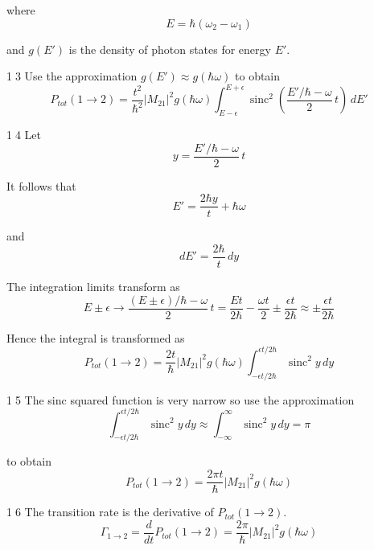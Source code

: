 \documentclass[12pt]{article}
\begin{document}
where
\begin{equation*}
E=\hbar(\omega_2-\omega_1)
\end{equation*}

and $g(E')$ is the density of photon states for energy $E'$.

\bigskip
\textcircled{\scriptsize13}
Use the approximation $g(E')\approx g(\hbar\omega)$ to obtain
\begin{equation*}
P_{tot}(1\rightarrow2)=\frac{t^2}{\hbar^2}|M_{21}|^2g(\hbar\omega)
\int_{E-\epsilon}^{E+\epsilon}
\operatorname{sinc}^2\left(\frac{E'/\hbar-\omega}{2}\,t\right)\,dE'
\end{equation*}

\textcircled{\scriptsize14}
Let
\begin{equation*}
y=\frac{E'/\hbar-\omega}{2}\,t
\end{equation*}

It follows that
\begin{equation*}
E'=\frac{2\hbar y}{t}+\hbar\omega
\end{equation*}

and
\begin{equation*}
dE'=\frac{2\hbar}{t}\,dy
\end{equation*}

The integration limits transform as
\begin{equation*}
E\pm\epsilon
\rightarrow
\frac{(E\pm\epsilon)/\hbar-\omega}{2}\,t
=\frac{Et}{2\hbar}-\frac{\omega t}{2}
\pm\frac{\epsilon t}{2\hbar}
\approx
\pm\frac{\epsilon t}{2\hbar}
\end{equation*}

Hence the integral is transformed as
\begin{equation*}
P_{tot}(1\rightarrow2)=\frac{2t}{\hbar}|M_{21}|^2g(\hbar\omega)
\int_{-\epsilon t/2\hbar}^{\epsilon t/2\hbar}
\operatorname{sinc}^2y\,dy
\end{equation*}

\textcircled{\scriptsize15}
The sinc squared function is very narrow so use the approximation
\begin{equation*}
\int_{-\epsilon t/2\hbar}^{\epsilon t/2\hbar}\operatorname{sinc}^2 y\,dy
\approx
\int_{-\infty}^\infty\operatorname{sinc}^2 y\,dy=\pi
\end{equation*}

to obtain
\begin{equation*}
P_{tot}(1\rightarrow2)=\frac{2\pi t}{\hbar}|M_{21}|^2g(\hbar\omega)
\end{equation*}

\textcircled{\scriptsize16}
The transition rate is the derivative of $P_{tot}(1\rightarrow2)$.
\begin{equation*}
\Gamma_{1\rightarrow2}
=\frac{d}{dt}P_{tot}(1\rightarrow2)=\frac{2\pi}{\hbar}|M_{21}|^2g(\hbar\omega)
\end{equation*}
\end{document}
